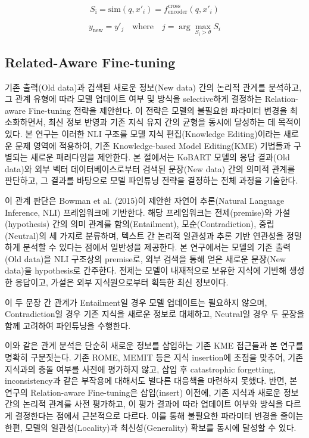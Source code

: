 \documentclass[a4paper,fleqn]{cas-sc}
\begin{document}
\begin{equation}
    S_{\text{i}} = \mathrm{sim}(q, x'_i) = f_{\text{encoder}}^{\text{cross}}(q, x'_i)
\end{equation}

\begin{equation}
    y_{\text{new}} = y'_{j} \quad \text{where} \quad j = \arg\max_{S_i > \theta} S_i
\end{equation}
    


\subsection{Related-Aware Fine-tuning}

기존 출력(Old data)과 검색된 새로운 정보(New data) 간의 논리적 관계를 분석하고, 그 관계 유형에 따라 모델 업데이트 여부 및 방식을 selective하게 결정하는 Relation-aware Fine-tuning 전략을 제안한다. 
이 전략은 모델의 불필요한 파라미터 변경을 최소화하면서, 최신 정보 반영과 기존 지식 유지 간의 균형을 동시에 달성하는 데 목적이 있다.
본 연구는 이러한 NLI 구조를 모델 지식 편집(Knowledge Editing)이라는 새로운 문제 영역에 적용하여, 기존 Knowledge-based Model Editing(KME) 기법들과 구별되는 새로운 패러다임을 제안한다.
본 절에서는 KoBART 모델의 응답 결과(Old data)와 외부 벡터 데이터베이스로부터 검색된 문장(New data) 간의 의미적 관계를 판단하고, 그 결과를 바탕으로 모델 파인튜닝 전략을 결정하는 전체 과정을 기술한다. 

이 관계 판단은 Bowman et al. (2015)이 제안한 자연어 추론(Natural Language Inference, NLI) 프레임워크에 기반한다. 
해당 프레임워크는 전제(premise)와 가설(hypothesis) 간의 의미 관계를 함의(Entailment), 모순(Contradiction), 중립(Neutral)의 세 가지로 분류하며, 텍스트 간 논리적 일관성과 추론 기반 연관성을 정밀하게 분석할 수 있다는 점에서 일반성을 제공한다.
본 연구에서는 모델의 기존 출력(Old data)을 NLI 구조상의 premise로, 외부 검색을 통해 얻은 새로운 문장(New data)을 hypothesis로 간주한다. 
전제는 모델이 내재적으로 보유한 지식에 기반해 생성한 응답이고, 가설은 외부 지식원으로부터 획득한 최신 정보이다.

이 두 문장 간 관계가 Entailment일 경우 모델 업데이트는 필요하지 않으며, Contradiction일 경우 기존 지식을 새로운 정보로 대체하고, Neutral일 경우 두 문장을 함께 고려하여 파인튜닝을 수행한다.

이와 같은 관계 분석은 단순히 새로운 정보를 삽입하는 기존 KME 접근들과 본 연구를 명확히 구분짓는다. 
기존 ROME, MEMIT 등은 지식 insertion에 초점을 맞추어, 기존 지식과의 충돌 여부를 사전에 평가하지 않고, 삽입 후 catastrophic forgetting, inconsistency과 같은 부작용에 대해서도 별다른 대응책을 마련하지 못했다.
반면, 본 연구의 Relation-aware Fine-tuning은 삽입(insert) 이전에, 기존 지식과 새로운 정보 간의 논리적 관계를 사전 평가하고, 이 평가 결과에 따라 업데이트 여부와 방식을 다르게 결정한다는 점에서 근본적으로 다르다. 
이를 통해 불필요한 파라미터 변경을 줄이는 한편, 모델의 일관성(Locality)과 최신성(Generality) 확보를 동시에 달성할 수 있다.
\end{document}

